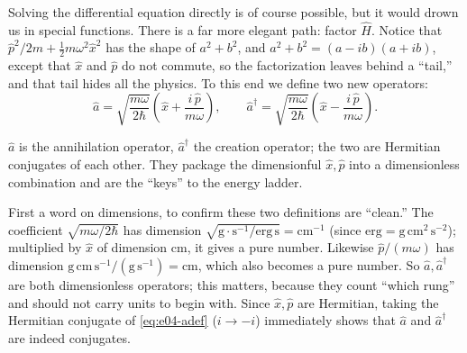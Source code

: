 Solving the differential equation directly is of course possible, but it would drown us in special functions. There is a far more elegant path: factor \(\hat H\). Notice that \(\hat p^2/2m+\tfrac12 m\omega^2\hat x^2\) has the shape of \(a^2+b^2\), and \(a^2+b^2=(a-ib)(a+ib)\), except that \(\hat x\) and \(\hat p\) do not commute, so the factorization leaves behind a ``tail,'' and that tail hides all the physics. To this end we define two new operators:
\begin{equation}
  \hat a=\sqrt{\frac{m\omega}{2\hbar}}\left(\hat x+\frac{i\,\hat p}{m\omega}\right),
  \qquad
  \hat a^\dagger=\sqrt{\frac{m\omega}{2\hbar}}\left(\hat x-\frac{i\,\hat p}{m\omega}\right).
  \label{eq:e04-adef}
\end{equation}
\begin{formulaexplain}
\(\hat a\) is the annihilation operator, \(\hat a^\dagger\) the creation operator; the two are Hermitian conjugates of each other. They package the dimensionful \(\hat x,\hat p\) into a dimensionless combination and are the ``keys'' to the energy ladder.
\end{formulaexplain}
First a word on dimensions, to confirm these two definitions are ``clean.'' The coefficient \(\sqrt{m\omega/2\hbar}\) has dimension \(\sqrt{\mathrm{g}\cdot\mathrm{s^{-1}}/\mathrm{erg\,s}}=\mathrm{cm^{-1}}\) (since \(\mathrm{erg}=\mathrm{g\,cm^2\,s^{-2}}\)); multiplied by \(\hat x\) of dimension cm, it gives a pure number. Likewise \(\hat p/(m\omega)\) has dimension \(\mathrm{g\,cm\,s^{-1}}/(\mathrm{g\,s^{-1}})=\mathrm{cm}\), which also becomes a pure number. So \(\hat a,\hat a^\dagger\) are both dimensionless operators; this matters, because they count ``which rung'' and should not carry units to begin with. Since \(\hat x,\hat p\) are Hermitian, taking the Hermitian conjugate of \eqref{eq:e04-adef} (\(i\to -i\)) immediately shows that \(\hat a\) and \(\hat a^\dagger\) are indeed conjugates.

